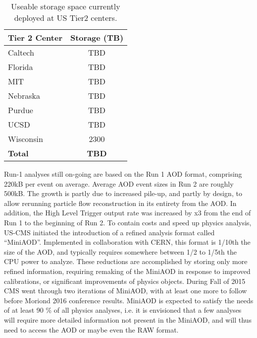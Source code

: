 \documentclass[11pt,a4paper]{article}
\begin{document}
\begin{table}
\begin{center}
\begin{tabular}{|l|c|}
\hline
{\bf Tier 2 Center}                         & {\bf Storage (TB)} \\ \hline
Caltech                                         & TBD \\
Florida                                          & TBD \\
MIT                                               & TBD \\
Nebraska                                      & TBD \\
Purdue                                          & TBD \\
UCSD                                           & TBD \\ 
Wisconsin                                     & 2300 \\ \hline
{\bf Total}                                       & {\bf TBD} \\ \hline
\end{tabular}
\caption[]
{
Useable storage space currently deployed at US Tier2 centers.
}
\label{storage-resources}
\end{center}
\end{table}

Run-1 analyses still on-going are based on the Run 1 AOD format, comprising 220kB per event on average.
Average AOD event sizes in Run 2 are roughly 500kB. The growth is partly due to increased pile-up, and partly by design,
to allow rerunning particle flow reconstruction in its entirety from the AOD.
In addition, the High Level Trigger output rate was increased by x3 from the end of Run 1 to the beginning of Run 2.
To contain costs and speed up physics analysis, US-CMS initiated the introduction of a 
refined analysis format called ``MiniAOD''.  Implemented in collaboration with CERN, this format is 1/10th the size of the AOD, 
and typically requires somewhere between 1/2 to 1/5th the CPU power to
analyze. These reductions are accomplished by storing only more refined information, 
requiring remaking of the MiniAOD in response to improved calibrations, or significant
improvements of physics objects. During Fall of 2015 CMS went through two iterations
of MiniAOD, with at least one more to follow before Moriond 2016 conference results.
MiniAOD is expected to satisfy the needs of at least 90 \% of all physics analyses, i.e. 
it is envisioned that a few analyses will require more detailed information not present 
in the MiniAOD, and will thus need to access the AOD or maybe even the RAW format.
\end{document}
